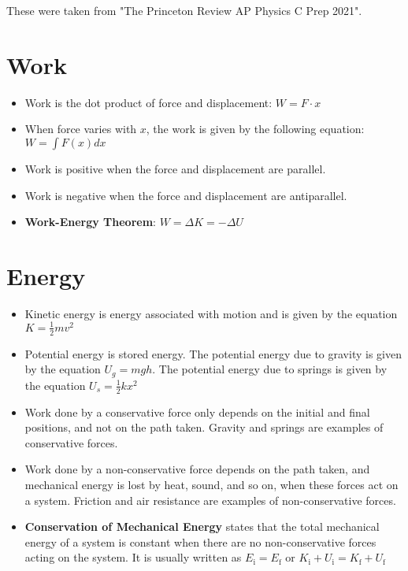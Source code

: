 \documentclass{article}
\begin{document}
\begin{note}
    These were taken from "The Princeton Review AP Physics C Prep 2021". 
\end{note}

\section{Work}
\begin{itemize}
    \item Work is the dot product of force and displacement: $W = F \cdot x$
    \item When force varies with $x$, the work is given by the following equation: $W = \int F(x) dx$
    \item Work is positive when the force and displacement are parallel.
    \item Work is negative when the force and displacement are antiparallel.
    \item \textbf{Work-Energy Theorem}: $W = \Delta K = -\Delta U$
\end{itemize}

\section{Energy}
\begin{itemize}
    \item Kinetic energy is energy associated with motion and is given by the equation $K = \frac{1}{2}mv^{2}$
    \item Potential energy is stored energy. The potential energy due to gravity is given by the equation $U_{g} = mgh$. The potential energy due to springs is given by the equation $U_{s}=\frac{1}{2}kx^{2}$
    \item Work done by a conservative force only depends on the initial and final positions, and not on the path taken. Gravity and springs are examples of conservative forces.
    \item Work done by a non-conservative force depends on the path taken, and mechanical energy is lost by heat, sound, and so on, when these forces act on a system. Friction and air resistance are examples of non-conservative forces.
    \item \textbf{Conservation of Mechanical Energy} states that the total mechanical energy of a system is constant when there are no non-conservative forces acting on the system. It is usually written as $E_{\text{i}} = E_{\text{f}}$ or $K_{\text{i}} + U_{\text{i}} = K_{\text{f}} + U_{\text{f}}$
\end{itemize}
\end{document}
